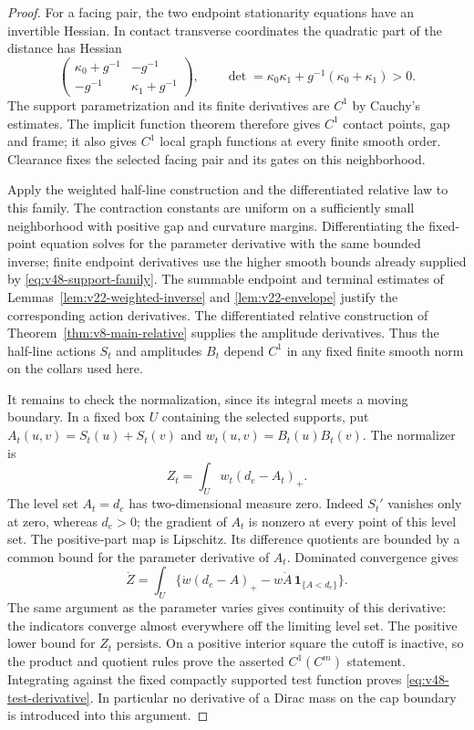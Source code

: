 \begin{proof}
For a facing pair, the two endpoint stationarity equations have an
invertible Hessian.  In contact transverse coordinates the quadratic
part of the distance has Hessian
\[
 \begin{pmatrix}\kappa_0+g^{-1}&-g^{-1}\\
                 -g^{-1}&\kappa_1+g^{-1}\end{pmatrix},
 \qquad
 \det=\kappa_0\kappa_1+g^{-1}(\kappa_0+\kappa_1)>0.
\]
The support parametrization and its finite derivatives are $C^1$ by
Cauchy's estimates.  The implicit function theorem therefore gives
$C^1$ contact points, gap and frame; it also gives $C^1$ local graph
functions at every finite smooth order.  Clearance fixes the selected
facing pair and its gates on this neighborhood.

Apply the weighted half-line construction and the differentiated
relative law to this family.  The contraction constants are uniform
on a sufficiently small neighborhood with positive gap and curvature
margins.  Differentiating the fixed-point equation solves for the
parameter derivative with the same bounded inverse; finite endpoint
derivatives use the higher smooth bounds already supplied by
\eqref{eq:v48-support-family}.  The summable endpoint and terminal
estimates of Lemmas~\ref{lem:v22-weighted-inverse} and
\ref{lem:v22-envelope} justify the corresponding action derivatives.
The differentiated relative construction of
Theorem~\ref{thm:v8-main-relative} supplies the amplitude derivatives.
Thus the half-line actions $S_t$ and amplitudes $B_t$ depend $C^1$ in
any fixed finite smooth norm on the collars used here.

It remains to check the normalization, since its integral meets a
moving boundary.  In a fixed box $U$ containing the selected supports,
put $A_t(u,v)=S_t(u)+S_t(v)$ and $w_t(u,v)=B_t(u)B_t(v)$.
The normalizer is
\[
                  Z_t=\int_U w_t(d_e-A_t)_+.
\]
The level set $A_t=d_e$ has two-dimensional measure zero.  Indeed
$S_t'$ vanishes only at zero, whereas $d_e>0$; the gradient of $A_t$
is nonzero at every point of this level set.  The positive-part map is
Lipschitz.  Its difference quotients are bounded by a common bound for
the parameter derivative of $A_t$.  Dominated convergence gives
\[
 \dot Z=\int_U\{\dot w(d_e-A)_+-w\dot A\,
                                     \mathbf1_{\{A<d_e\}}\}.
\]
The same argument as the parameter varies gives continuity of this
derivative: the indicators converge almost everywhere off the limiting
level set.  The positive lower bound for $Z_t$ persists.  On a positive
interior square the cutoff is inactive, so the product and quotient
rules prove the asserted $C^1(C^m)$ statement.  Integrating against the
fixed compactly supported test function proves
\eqref{eq:v48-test-derivative}.  In particular no derivative of a Dirac
mass on the cap boundary is introduced into this argument.
\end{proof}

